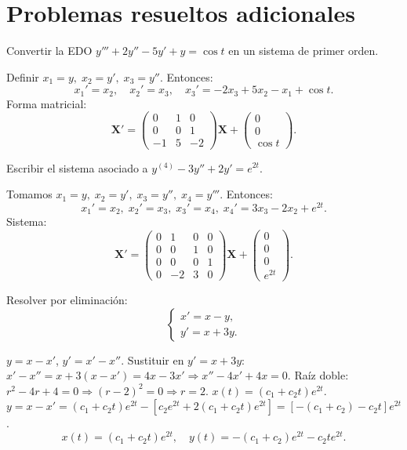 \section{Problemas resueltos adicionales}

\begin{prob}
Convertir la EDO $y'''+2y''-5y'+y=\cos t$ en un sistema de primer orden.
\begin{myproof}
Definir $x_1=y,\; x_2=y',\; x_3=y''$. Entonces:
\[
x_1'=x_2,\quad x_2'=x_3,\quad x_3'=-2x_3+5x_2-x_1+\cos t.
\]
Forma matricial:
\[
\boxed{
\mathbf{X}'=
\begin{pmatrix}
0&1&0\\
0&0&1\\
-1&5&-2
\end{pmatrix}
\mathbf{X}
+
\begin{pmatrix}
0\\0\\\cos t
\end{pmatrix}.
}
\]
\end{myproof}
\end{prob}

\begin{prob}
Escribir el sistema asociado a $y^{(4)}-3y''+2y'= e^{2t}$.
\begin{myproof}
Tomamos $x_1=y,\; x_2=y',\; x_3=y'',\; x_4=y'''$. Entonces:
\[
x_1'=x_2,\; x_2'=x_3,\; x_3'=x_4,\; x_4'=3x_3-2x_2+e^{2t}.
\]
Sistema:
\[
\boxed{
\mathbf{X}'=
\begin{pmatrix}
0&1&0&0\\
0&0&1&0\\
0&0&0&1\\
0&-2&3&0
\end{pmatrix}
\mathbf{X}
+
\begin{pmatrix}
0\\0\\0\\e^{2t}
\end{pmatrix}.
}
\]
\end{myproof}
\end{prob}

\begin{prob}
Resolver por eliminación:
\[
\begin{cases}
x'=x-y,\\
y'=x+3y.
\end{cases}
\]
\begin{myproof}
$y=x-x'$, $y'=x'-x''$. Sustituir en $y'=x+3y$:
$x'-x''=x+3(x-x')=4x-3x'\Rightarrow x''-4x'+4x=0$.
Raíz doble: $r^2-4r+4=0\Rightarrow (r-2)^2=0\Rightarrow r=2$.
$x(t)=(c_1+c_2 t)e^{2t}$.
$y=x-x'=(c_1+c_2 t)e^{2t}-[c_2 e^{2t}+2(c_1+c_2 t)e^{2t}]=[-(c_1+c_2)-c_2 t]e^{2t}$.
\[
\boxed{
x(t)=(c_1+c_2 t)e^{2t},\quad
y(t)=-(c_1+c_2)e^{2t}-c_2 t e^{2t}.
}
\]
\end{myproof}
\end{prob}

